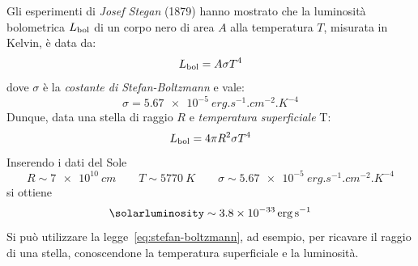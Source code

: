 Gli esperimenti di \emph{Josef Stegan} (1879) hanno mostrato che la luminosità bolometrica $L_\textup{bol}$ di un corpo nero di area $A$ alla temperatura $T$, misurata in Kelvin, è data da:
\[
    L_\textup{bol} = A \sigma T^4
\]
dove $\sigma$ è la \emph{costante di Stefan-Boltzmann} e vale:
\[
    \sigma = \SI{5.67e-5}{erg.s^{-1}.cm^{-2}.K^{-4}}
\]
Dunque, data una stella di raggio $R$ e \emph{temperatura superficiale} T:
\begin{equation}\label{eq:stefan-boltzmann}
    L_\textup{bol} = 4 \pi R^2 \sigma T^4
\end{equation}
Inserendo i dati del Sole
\[
    R \sim \SI{7e10}{cm} \qquad T \sim \SI{5770}{K} \qquad \sigma \sim \SI{5.67e-5}{erg.s^{-1}.cm^{-2}.K^{-4}}
\]
si ottiene
\[
    \si{\solarluminosity} \sim \SI{3.8e-33}{erg.s^{-1}}
\]
Si può utilizzare la legge~\eqref{eq:stefan-boltzmann}, ad esempio, per ricavare il raggio di una stella, conoscendone la temperatura superficiale e la luminosità.